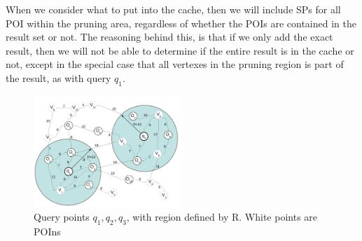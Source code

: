 When we consider what to put into the cache, then we will include SPs for all POI within the pruning area, regardless of whether the POIs are contained in the result set or not. The reasoning behind this, is that if we only add the exact result, then we will not be able to determine if the entire result is in the cache or not, except in the special case that all vertexes in the pruning region is part of the result, as with query $q_1$.


\begin{figure}[hbt]
  \center
        \includegraphics[width=0.5\textwidth]{figures/queryreg}
        \caption{Query points $q_1,q_2,q_3$, with region defined by R. White points are POIns}
  \label{fig:queryreg}
\end{figure}
